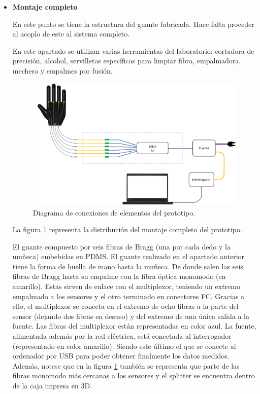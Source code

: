\begin{itemize}
	
	\item \textbf{Montaje completo}
	
	En este punto se tiene la estructura del guante fabricada. Hace falta proceder al acoplo de este al sistema completo. 
	
	En este apartado se utilizan varias herramientas del laboratorio: cortadora de precisión, alcohol, servilletas específicas para limpiar fibra, empalmadora, mechero y empalmes por fusión.
	
	\begin{figure}[H]
		\centering
		\includegraphics[width=1\textwidth]{./img/diagramaFBG}
		\caption{Diagrama de conexiones de elementos del prototipo.} \label{fig:diagramaFBG}
	\end{figure}
	
	La figura \ref{fig:diagramaFBG} representa la distribución del montaje completo del prototipo. 
	
	El guante compuesto por seis fibras de Bragg (una por cada dedo y la muñeca) embebidas en PDMS. El guante realizado en el apartado anterior tiene la forma de huella de mano hasta la muñeca. De donde salen las seis fibras de Bragg hasta su empalme con la fibra óptica monomodo (en amarillo). Estas sirven de enlace con el multiplexor, teniendo un extremo empalmado a los sensores y el otro terminado en conectores FC. Gracias a ello, el multiplexor se conecta en el extremo de ocho fibras a la parte del sensor (dejando dos fibras en desuso) y del extremo de una única salida a la fuente. Las fibras del multiplexor están representadas en color azul. La fuente, alimentada además por la red eléctrica, está conectada al interrogador (representado en color amarillo). Siendo este último el que se conecte al ordenador por USB para poder obtener finalmente los datos medidos. Además, notese que en la figura \ref{fig:diagramaFBG} también se representa que parte de las fibras monomodo más cercanas a los sensores y el splitter se encuentra dentro de la caja impresa en 3D. 
	

\end{itemize}
